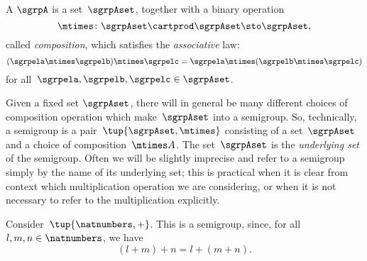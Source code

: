 

\section{}\label{sec:semigroups}


\begin{ctdefinition}[Semigroup]
  \label{def:semigroup}
  A \emph{} $\sgrpA$ is a set~$\sgrpAset$, together with a binary operation~
  \begin{equation}
    \mtimes  \colon \sgrpAset \cartprod \sgrpAset \sto \sgrpAset,
  \end{equation}
  called \emph{composition}, which satisfies the \emph{associative} law:
  \begin{equation}
    \label{eq:semigroup-associative}
    (\sgrpela \mtimes   \sgrpelb)\mtimes   \sgrpelc
    = \sgrpela \mtimes   (\sgrpelb \mtimes  \sgrpelc)
  \end{equation}
  for all~$\sgrpela , \sgrpelb, \sgrpelc \in \sgrpAset$.
\end{ctdefinition}


\begin{remark}
  Given a fixed set $\sgrpAset$, there will in general be many different choices of composition operation which make~$\sgrpAset$ into a semigroup.
  So, technically, a semigroup is a pair~$\tup{\sgrpAset, \mtimes}$ consisting of a set~$\sgrpAset$ and a choice of composition~$\mtimes A$.
  The set~$\sgrpAset$ is the \emph{underlying set} of the semigroup.
  Often we will be slightly imprecise and refer to a semigroup simply by the name of its underlying set; this is practical when it is clear from context which multiplication operation we are considering, or when it is not necessary to refer to the multiplication explicitly.
\end{remark}

\begin{example}
  \label{natnum-semigroup}
  Consider~$\tup{\natnumbers,+}$. This is a semigroup, since, for all~$l,m, n \in \natnumbers$, we have
  \begin{equation*}
  (l+m)
    +n
    =l+(m+n).
  \end{equation*}
\end{example}

\newcommand{\worda}{\alphabeta \alphabeta \alphabetb \alphabeta \alphabetb \alphabetb \alphabetb \alphabeta }
\newcommand{\wordb}{ \alphabetb \alphabetb \alphabeta \alphabetb}

